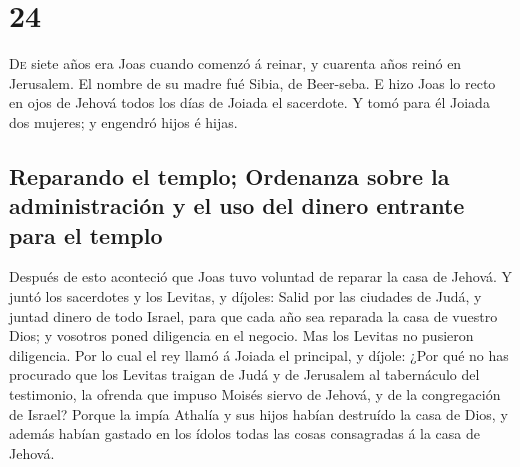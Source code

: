 \hypertarget{section-23}{%
\section{24}\label{section-23}}

 \textsc{De} siete años era Joas cuando comenzó á reinar,
y cuarenta años reinó en Jerusalem. El nombre de su madre fué Sibia, de
Beer-seba.  E hizo Joas lo recto en ojos de Jehová todos
los días de Joiada el sacerdote.  Y tomó para él Joiada
dos mujeres; y engendró hijos é hijas.

\hypertarget{reparando-el-templo-ordenanza-sobre-la-administraciuxf3n-y-el-uso-del-dinero-entrante-para-el-templo}{%
\subsection{Reparando el templo; Ordenanza sobre la administración y el
uso del dinero entrante para el
templo}\label{reparando-el-templo-ordenanza-sobre-la-administraciuxf3n-y-el-uso-del-dinero-entrante-para-el-templo}}

 Después de esto aconteció que Joas tuvo voluntad de
reparar la casa de Jehová.  Y juntó los sacerdotes y los
Levitas, y díjoles: Salid por las ciudades de Judá, y juntad dinero de
todo Israel, para que cada año sea reparada la casa de vuestro Dios; y
vosotros poned diligencia en el negocio. Mas los Levitas no pusieron
diligencia.  Por lo cual el rey llamó á Joiada el
principal, y díjole: ¿Por qué no has procurado que los Levitas traigan
de Judá y de Jerusalem al tabernáculo del testimonio, la ofrenda que
impuso Moisés siervo de Jehová, y de la congregación de Israel?
 Porque la impía Athalía y sus hijos habían destruído la
casa de Dios, y además habían gastado en los ídolos todas las cosas
consagradas á la casa de Jehová.

